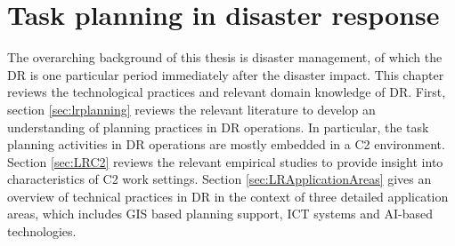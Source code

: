 \chapter{Task planning in disaster response}\label{ch:literatures}
The overarching background of this thesis is disaster management, of which the \acf{DR} is one particular period immediately after the disaster impact. This chapter reviews the technological practices and relevant domain knowledge of \ac{DR}. First, section \ref{sec:lrplanning} reviews the relevant literature to develop an understanding of planning practices in \ac{DR} operations. In particular, the task planning activities in \ac{DR} operations are mostly embedded in a \acf{C2} environment. Section \ref{sec:LRC2} reviews the relevant empirical studies to provide insight into characteristics of \ac{C2} work settings. Section \ref{sec:LRApplicationAreas} gives an overview of technical practices in \ac{DR} in the context of three detailed application areas, which includes \acf{GIS} based planning support, \acf{ICT} systems and \ac{AI}-based technologies. \\




